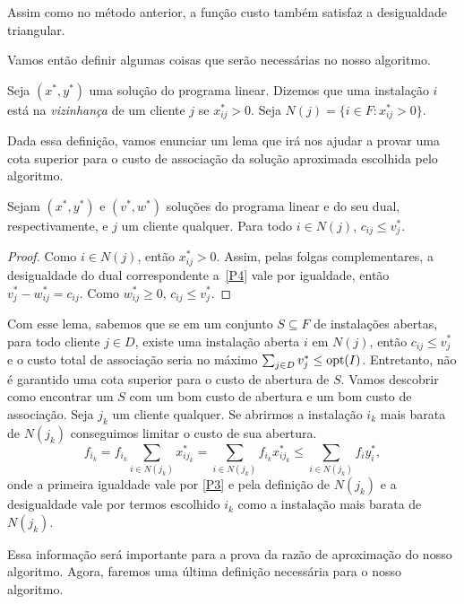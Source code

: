 Assim como no método anterior, a função custo também satisfaz a desigualdade triangular.

Vamos então definir algumas coisas que serão necessárias no nosso algoritmo.
\begin{definition}
    Seja $(x^*,y^*)$ uma solução do programa linear. Dizemos que uma instalação $i$ está na \emph{vizinhança} de um cliente $j$ se $x^*_{ij} > 0$. Seja $N(j) = \{ i \in F : x^*_{ij} > 0\}$.
\end{definition}
Dada essa definição, vamos enunciar um lema que irá nos ajudar a provar uma cota superior para o custo de associação da solução aproximada escolhida pelo algoritmo.
\begin{lemma}\label{lemma:3.5}
    Sejam $(x^*,y^*)$ e $(v^*,w^*)$ soluções do programa linear e do seu dual, respectivamente, e $j$ um cliente qualquer. Para todo $i \in N(j)$, $c_{ij} \leq v^*_j$.
\end{lemma}
\begin{proof}
    Como $i \in N(j)$, então $x^*_{ij}>0$. Assim, pelas folgas complementares, a desigualdade do dual correspondente a~\eqref{P4} vale por igualdade, então $v^*_j - w^*_{ij} = c_{ij}$. Como $w^*_{ij} \geq 0$, $c_{ij} \leq v^*_j$. 
\end{proof}
Com esse lema, sabemos que se em um conjunto $S \subseteq F$ de instalações abertas, para todo cliente $j \in D$, existe uma instalação aberta $i$ em $N(j)$, então $c_{ij}\leq v_j^*$ e o custo total de associação seria no máximo $\sum_{j\in D}v_j^* \leq \mathrm{opt}(I)$. Entretanto, não é garantido uma cota superior para o custo de abertura de $S$. Vamos descobrir como encontrar um $S$ com um bom custo de abertura e um bom custo de associação. Seja $j_k$ um cliente qualquer. Se abrirmos a instalação $i_k$ mais barata de $N(j_k)$ conseguimos limitar o custo de sua abertura.
\[\tag{*} \label{relx_fl:*}
    f_{i_k} = f_{i_k} \sum_{i \in N(j_k)}x^*_{ij_k} = \sum_{i \in N(j_k)}f_{i_k}x^*_{ij_k} \leq \sum_{i \in N(j_k)}f_{i}y^*_{i},
\]
onde a primeira igualdade vale por \eqref{P3} e pela definição de $N(j_k)$ e a desigualdade vale por termos escolhido $i_k$ como a instalação mais barata de $N(j_k)$.

Essa informação será importante para a prova da razão de aproximação do nosso algoritmo. Agora, faremos uma última definição necessária para o nosso algoritmo.

